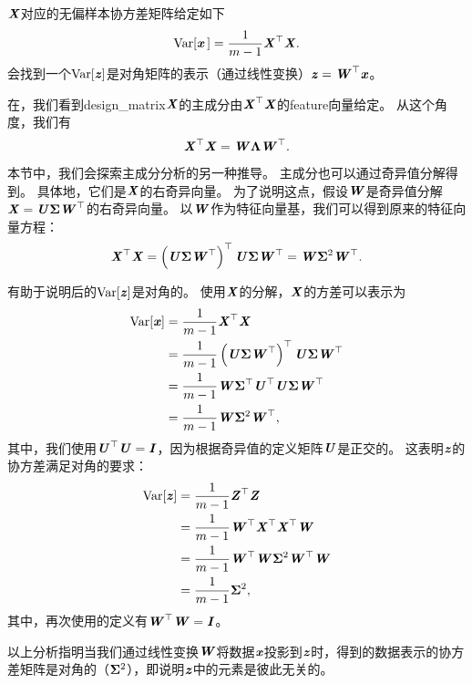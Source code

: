 $\MX$对应的无偏样本协方差矩阵给定如下
\begin{equation}
    \text{Var}[\Vx\,] = \frac{1}{m-1} \MX^\Tsp \MX .
\end{equation}
会找到一个$\text{Var}[\Vz]$是对角矩阵的表示（通过线性变换）$\Vz=\MW^\Tsp\Vx$。

在，我们看到\gls{design_matrix}$\MX$的主成分由$\MX^\Tsp\MX$的\gls{feature}向量给定。
从这个角度，我们有
\begin{equation}
    \MX^\Tsp\MX = \MW \VLambda \MW^\Tsp .
\end{equation}
本节中，我们会探索主成分分析的另一种推导。
主成分也可以通过奇异值分解得到。
具体地，它们是$\MX$的右奇异向量。
为了说明这点，假设$\MW$是奇异值分解$\MX = \MU\VSigma\MW^\Tsp$的右奇异向量。
以$\MW$作为特征向量基，我们可以得到原来的特征向量方程：
\begin{equation}
    \MX^\Tsp\MX = \left( \MU\VSigma \MW^\Tsp \right)^\Tsp \MU\VSigma \MW^\Tsp = 
    \MW \VSigma^2 \MW^\Tsp .
\end{equation}


有助于说明后的$\text{Var}[\Vz]$是对角的。
使用$\MX$的分解，$\MX$的方差可以表示为
\begin{align}
    \text{Var}[\Vx] &= \frac{1}{m-1} \MX^\Tsp\MX \\
    &= \frac{1}{m-1} \left( \MU\VSigma \MW^\Tsp \right)^\Tsp \MU\VSigma \MW^\Tsp \\
    &= \frac{1}{m-1} \MW \VSigma^\Tsp \MU^\Tsp \MU\VSigma \MW^\Tsp \\
    &= \frac{1}{m-1} \MW \VSigma^2 \MW^\Tsp ,
\end{align}
其中，我们使用$\MU^\Tsp\MU = \MI$，因为根据奇异值的定义矩阵$\MU$是正交的。
这表明$\Vz$的协方差满足对角的要求：
\begin{align}
    \text{Var}[\Vz] &= \frac{1}{m-1} \MZ^\Tsp\MZ \\
    &= \frac{1}{m-1} \MW^\Tsp \MX^\Tsp \MX^\Tsp \MW \\
    &= \frac{1}{m-1} \MW^\Tsp\MW \VSigma^2 \MW^\Tsp\MW \\
    &= \frac{1}{m-1} \VSigma^2 ,
\end{align}
其中，再次使用的定义有$\MW^\Tsp\MW = \MI$。

以上分析指明当我们通过线性变换$\MW$将数据$\Vx$投影到$\Vz$时，得到的数据表示的协方差矩阵是对角的（$\VSigma^2$），即说明$\Vz$中的元素是彼此无关的。

